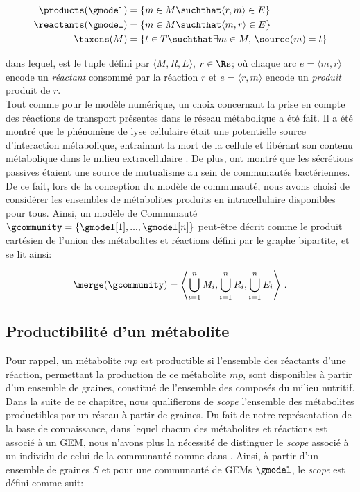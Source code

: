 \documentclass[../main.tex]{subfiles}
\begin{document}
\begin{align}
\begin{split}
    \products(\gmodel) &= \{ m\in M \suchthat \langle r, m\rangle \in E \} \\
    \reactants(\gmodel) &= \{ m\in M \suchthat \langle m, r\rangle \in E \} \\
    \taxons(M) & = \{ t \in T \suchthat \exists m\in M ,\, \source(m) = t \}
\end{split}
\end{align}

dans lequel, \gmodel est le tuple défini par $\langle M, R, E \rangle$, $r \in \Rs$; où chaque arc $e = \langle m,r \rangle$ encode un \emph{réactant} consommé par la réaction $r$ et $e = \langle r,m \rangle$ encode un \emph{produit} produit de $r$. \\

Tout comme pour le modèle numérique, un choix concernant la prise en compte des réactions de transport présentes dans le réseau métabolique a été fait. Il a été montré que le phénomène de lyse cellulaire était une potentielle source d'interaction métabolique, entrainant la mort de la cellule et libérant son contenu métabolique dans le milieu extracellulaire \citep{Fazzino2020}. De plus, \citep{Pacheco.2019m3q} ont montré que les sécrétions passives étaient une source de mutualisme au sein de communautés bactériennes. De ce fait, lors de la conception du modèle de communauté, nous avons choisi de considérer les ensembles de métabolites produits en intracellulaire disponibles pour tous. Ainsi, un modèle de Communauté \( \gcommunity = \{ \gmodel[1], ..., \gmodel[n] \}\) peut-être décrit comme le produit cartésien de l'union des métabolites et réactions défini par le graphe bipartite, et se lit ainsi:

\[
\merge(\gcommunity) = 
\left\langle \bigcup^{n}_{i=1} M_i, \bigcup^{n}_{i=1} R_i, \bigcup^{n}_{i=1} E_i \right\rangle \,.
\]

\subsection{Productibilité d'un métabolite}
Pour rappel, un métabolite $mp$ est productible si l'ensemble des réactants d'une réaction, permettant la production de ce métabolite $mp$, sont disponibles à partir d'un ensemble de graines, constitué de l'ensemble des composés du milieu nutritif. Dans la suite de ce chapitre, nous qualifierons de \emph{scope} l'ensemble des métabolites productibles par un réseau à partir de graines. Du fait de notre représentation de la base de connaissance, dans lequel chacun des métabolites et réactions est associé à un GEM, nous n'avons plus la nécessité de distinguer le \emph{scope} associé à un individu de celui de la communauté comme dans \citep{Frioux2018}. Ainsi, à partir d'un ensemble de graines $S$ et pour une communauté de GEMs $\gmodel$, le \emph{scope} est défini comme suit:
\end{document}
